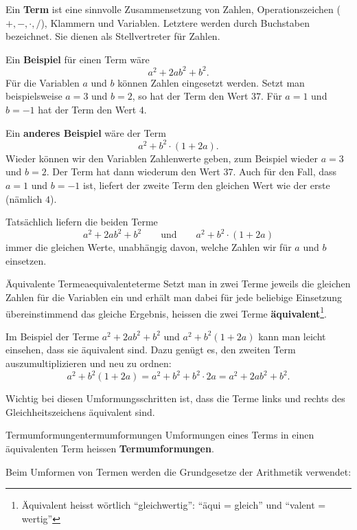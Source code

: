 \clearpage
Ein \textbf{Term} ist eine sinnvolle Zusammensetzung von Zahlen, Operationszeichen (\(+,-,\cdot,/\)), Klammern und Variablen. Letztere werden durch Buchstaben bezeichnet. Sie dienen als Stellvertreter für Zahlen.

Ein \textbf{Beispiel} für einen Term wäre
\[
    a^2+2ab^2+b^2.
\]
Für die Variablen \(a\) und \(b\) können Zahlen eingesetzt werden. Setzt man beispielsweise \(a=3\) und \(b=2\), so hat der Term den Wert \(37\). Für \(a=1\) und \(b=-1\) hat der Term den Wert \(4\).

Ein \textbf{anderes Beispiel} wäre der Term
\[
    a^2+b^2\cdot(1+2a).
\]
Wieder können wir den Variablen Zahlenwerte geben, zum Beispiel wieder \(a=3\) und \(b=2\). Der Term hat dann wiederum den Wert \(37\). Auch für den Fall, dass \(a=1\) und \(b=-1\) ist, liefert der zweite Term den gleichen Wert wie der erste (nämlich \(4\)).

Tatsächlich liefern die beiden Terme
\[
    a^2+2ab^2+b^2
    \qquad\text{und}\qquad
    a^2+b^2\cdot(1+2a)
\]
immer die gleichen Werte, unabhängig davon, welche Zahlen wir für \(a\) und \(b\) einsetzen.

\begin{definition}{Äquivalente Terme}{aequivalenteterme}
    Setzt man in zwei Terme jeweils die gleichen Zahlen für die Variablen ein und erhält man dabei für jede beliebige Einsetzung übereinstimmend das gleiche Ergebnis, heissen die zwei Terme \textbf{äquivalent}\footnote{Äquivalent heisst wörtlich \enquote{gleichwertig}: \enquote{äqui = gleich} und \enquote{valent = wertig}}.
\end{definition}

Im Beispiel der Terme \(a^2+2ab^2+b^2\) und \(a^2+b^2(1+2a)\) kann man leicht einsehen, dass sie äquivalent sind. Dazu genügt es, den zweiten Term auszumultiplizieren und neu zu ordnen:
\[
    a^2+b^2(1+2a)
    = a^2+b^2+b^2\cdot2a
    = a^2+2ab^2+b^2.
\]

Wichtig bei diesen Umformungsschritten ist, dass die Terme links und rechts des Gleichheitszeichens äquivalent sind.

\begin{definition}{Termumformungen}{termumformungen}
    Umformungen eines Terms in einen äquivalenten Term heissen \textbf{Termumformungen}.
\end{definition}

Beim Umformen von Termen werden die Grundgesetze der Arithmetik verwendet:

